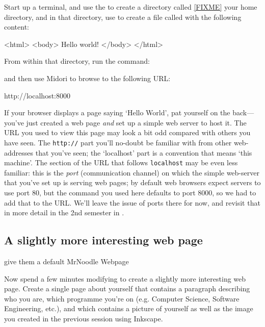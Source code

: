 Start up a terminal, and use the  to create a directory called \ref{FIXME} your home directory, and in that directory, use  to create a file called  with the following content:

\begin{ttoutenv}
<html>
<body>
Hello world!
</body>
</html>
\end{ttoutenv}

From within that directory, run the command:


and then use Midori to browse to the following URL:

\begin{ttoutenv}
http://localhost:8000
\end{ttoutenv}

If your browser displays a page saying `Hello World', pat yourself on the back---you've just created a web page \textit{and} set up a simple web server to host it. The URL you used to view this page may look a bit odd compared with others you have seen. The \texttt{http://} part you'll no-doubt be familiar with from other web-addresses that you've seen; the `localhost' part is a convention that means `this machine'. The section of the URL that follows \texttt{localhost} may be even less familiar: this is the \textit{port} (communication channel) on which the simple web-server that you've set up is serving web pages; by default web browsers expect servers to use port 80, but the  command you used here defaults to port 8000, so we had to add that to the URL. We'll leave the issue of ports there for now, and revisit that in more detail in the 2nd semester in . 

\subsection{A slightly more interesting web page}

\begin{note}
give them a default MrNoodle Webpage
\end{note}

Now spend a few minutes modifying  to create a slightly more interesting web page. Create a single page about yourself that contains a paragraph describing who you are, which programme you're on (e.g. Computer Science, Software Engineering, etc.), and which contains a picture of yourself as well as the image you created in the previous session using Inkscape.

